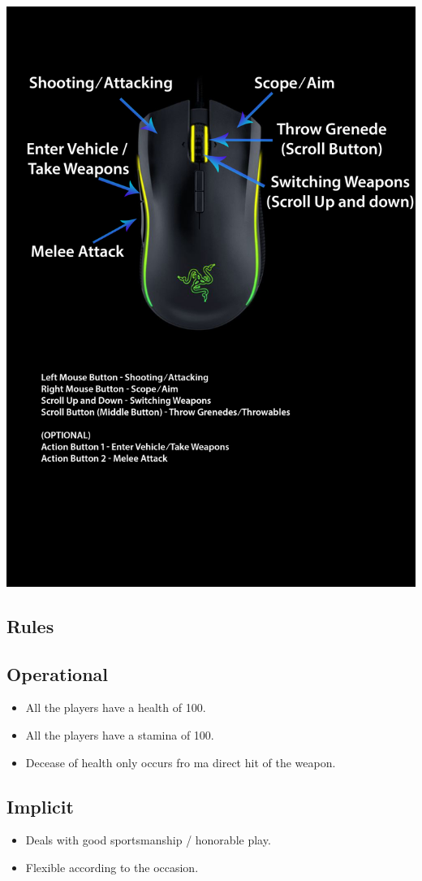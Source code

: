         \includegraphics[width=\linewidth]{images/mouse_layout.png}
    \subsection{Rules}
        \subsection{Operational}
            \begin{itemize}
                \item All the players have a health of 100.
                \item All the players have a stamina of 100.
                \item Decease of health only occurs fro ma direct hit of the weapon.
            \end{itemize}
        \subsection{Implicit}
            \begin{itemize}
                \item Deals with good sportsmanship / honorable play.
                \item Flexible according to the occasion.
            \end{itemize}
